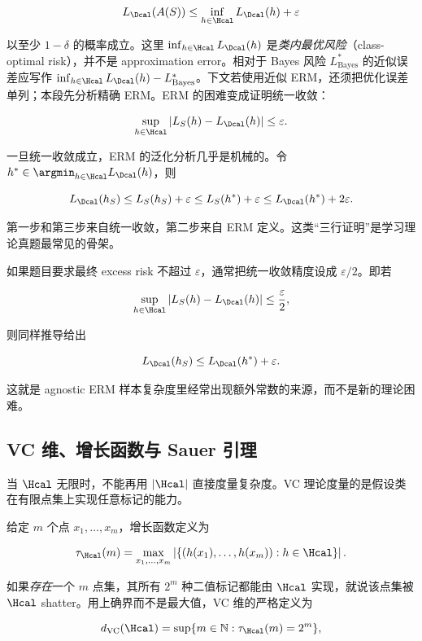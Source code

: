 \[
  L_{\Dcal}(A(S))
  \le
  \inf_{h\in\Hcal}L_{\Dcal}(h)+\varepsilon
\]

以至少 \(1-\delta\) 的概率成立。这里 \(\inf_{h\in\Hcal}L_{\Dcal}(h)\) 是\emph{类内最优风险}（class-optimal risk），并不是 approximation error。相对于 Bayes 风险 \(L^*_{\mathrm{Bayes}}\) 的近似误差应写作 \(\inf_{h\in\Hcal}L_{\Dcal}(h)-L^*_{\mathrm{Bayes}}\)。下文若使用近似 ERM，还须把优化误差单列；本段先分析精确 ERM。ERM 的困难变成证明统一收敛：

\[
  \sup_{h\in\Hcal}
  |L_S(h)-L_{\Dcal}(h)|
  \le \varepsilon.
\]

一旦统一收敛成立，ERM 的泛化分析几乎是机械的。令 \(h^*\in\argmin_{h\in\Hcal}L_{\Dcal}(h)\)，则

\[
  L_{\Dcal}(h_S)
  \le L_S(h_S)+\varepsilon
  \le L_S(h^*)+\varepsilon
  \le L_{\Dcal}(h^*)+2\varepsilon.
\]

第一步和第三步来自统一收敛，第二步来自 ERM 定义。这类“三行证明”是学习理论真题最常见的骨架。

如果题目要求最终 excess risk 不超过 \(\varepsilon\)，通常把统一收敛精度设成 \(\varepsilon/2\)。即若

\[
  \sup_{h\in\Hcal}
  |L_S(h)-L_{\Dcal}(h)|
  \le \frac{\varepsilon}{2},
\]

则同样推导给出

\[
  L_{\Dcal}(h_S)
  \le
  L_{\Dcal}(h^*)+\varepsilon.
\]

这就是 agnostic ERM 样本复杂度里经常出现额外常数的来源，而不是新的理论困难。

\subsection{VC 维、增长函数与 Sauer 引理}


当 \(\Hcal\) 无限时，不能再用 \(|\Hcal|\) 直接度量复杂度。VC 理论度量的是假设类在有限点集上实现任意标记的能力。

 给定 \(m\) 个点 \(x_1,\ldots,x_m\)，增长函数定义为

\[
  \tau_{\Hcal}(m)
  =
  \max_{x_1,\ldots,x_m}
  \left|
  \{
    (h(x_1),\ldots,h(x_m)):h\in\Hcal
  \}
  \right|.
\]

如果\emph{存在}一个 \(m\) 点集，其所有 \(2^m\) 种二值标记都能由 \(\Hcal\) 实现，就说该点集被 \(\Hcal\) shatter。用上确界而不是最大值，VC 维的严格定义为

\[
  d_{\mathrm{VC}}(\Hcal)
  =
  \sup\{m\in\mathbb{N}:\tau_{\Hcal}(m)=2^m\},
\]

